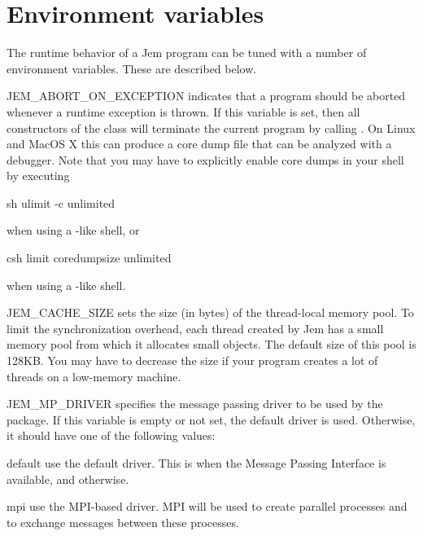 \documentclass[a4paper,10pt]{article}
\begin{document}

\section{Environment variables
  \label{section:environment-variables}}

The runtime behavior of a Jem program can be tuned with a number of
environment variables. These are described below.
\begin{Description}[\Code]

\item[JEM_ABORT_ON_EXCEPTION] indicates that a program should be aborted
  whenever a runtime exception is thrown. If this variable is set, then
  all constructors of the class  will terminate
  the current program by calling . On Linux and MacOS X this
  can produce a core dump file that can be analyzed with a debugger. Note
  that you may have to explicitly enable core dumps in your shell by
  executing
  \begin{Source}[gobble=4]{sh}
    ulimit -c unlimited
  \end{Source}
  when using a -like shell, or
  \begin{Source}[gobble=4]{csh}
    limit coredumpsize unlimited
  \end{Source}
  when using a -like shell.

\item[JEM_CACHE_SIZE] sets the size (in bytes) of the thread-local memory
  pool. To limit the synchronization overhead, each thread created by Jem
  has a small memory pool from which it allocates small objects. The
  default size of this pool is 128KB. You may have to decrease the size
  if your program creates a lot of threads on a low-memory machine.

\item[JEM_MP_DRIVER] \label{envar:JEM-MP-DRIVER} specifies the message
  passing driver to be used by the  package. If this variable is
  empty or not set, the default driver is used. Otherwise, it should have
  one of the following values:
  \begin{Description}[\Code]

  \item[default] use the default driver. This is  when the
    Message Passing Interface is available, and  otherwise.

  \item[mpi] use the MPI-based driver. MPI will be used to create
    parallel processes and to exchange messages between these
    processes.


\end{Description}
\end{Description}
\end{document}
